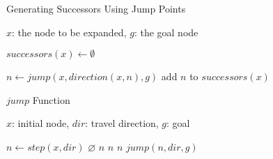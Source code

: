 \begin{algorithm}[b]
\caption{Generating Successors Using Jump Points}
\label{alg:successors}
\begin{algorithmic}[1]
\REQUIRE $x$: the node to be expanded, $g$: the goal node 

\STATE $successors(x) \leftarrow \emptyset$

\STATE $n \leftarrow jump(x, direction(x, n), g)$
\STATE add $n$ to $successors(x)$
\ENDFOR

\end{algorithmic}
\end{algorithm}

\begin{algorithm}[b]
\caption{$jump$ Function}
\label{alg:jump}
\begin{algorithmic}[1]
\REQUIRE $x$: initial node, $dir$: travel direction, $g$: goal

\STATE $n \leftarrow step(x, dir)$
	\RETURN $\varnothing$
\ENDIF
{}
	\RETURN $n$
\ENDIF
{}
	\RETURN $n$
\ENDIF
{}
			\RETURN $n$
		\ENDIF
	\ENDFOR
\ENDIF
\RETURN $jump(n, dir, g)$
\end{algorithmic}
\end{algorithm}
